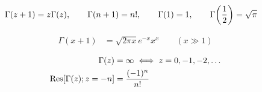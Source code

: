 \documentclass[uplatex,dvipdfmx,a4paper,11pt]{jlreq}
\theoremstyle{definition}
\begin{document}
\begin{proposition}
  \begin{align}
    \Gamma(z + 1) & = z\Gamma(z), \qquad \Gamma(n + 1) = n!, \qquad \Gamma(1)= 1, \qquad \Gamma\qty(\frac{1}{2}) = \sqrt{\pi}
  \end{align}
\end{proposition}

\begin{proposition}
  \begin{align}
    \Gamma(x + 1) & = \sqrt{2\pi x}e^{-x}x^x \qquad (x \gg 1)
  \end{align}
\end{proposition}

\begin{proposition}[ガンマ関数の特異点]
  \begin{align}
    \Gamma(z)               & = \infty \iff z = 0, -1, -2, \ldots \\
    \Res[\Gamma(z); z = -n] & = \frac{(-1)^n}{n!}
  \end{align}
\end{proposition}
\end{document}
